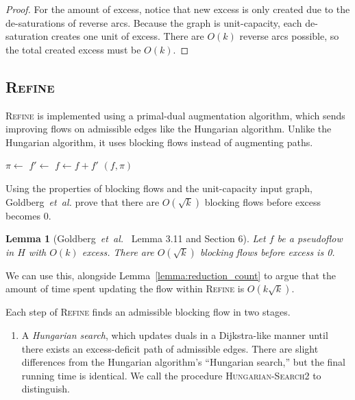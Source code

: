 \documentclass[11pt]{article}
\def\etal{\textsl{et~al.}}
\theoremstyle{plain}
\newtheorem{lemma}{Lemma}
\begin{document}
\begin{figure*}
\begin{proof}
	For the amount of excess, notice that new excess is only created due
	to the de-saturations of reverse arcs.
	Because the graph is unit-capacity, each de-saturation creates one unit
	of excess.
	There are $O(k)$ reverse arcs possible, so the total created excess
	must be $O(k)$.
\end{proof}

\subsection{\textsc{Refine}}

\textsc{Refine} is implemented using a primal-dual augmentation algorithm,
which sends improving flows on admissible edges like the Hungarian algorithm.
Unlike the Hungarian algorithm, it uses blocking flows instead of augmenting
paths.

\begin{algorithm}
\caption{Refinement}
\begin{algorithmic}[1]
		\State $\pi \gets$ 
		\State $f' \gets$ 
		\State $f \gets f + f'$
	\EndWhile
	\State\Return $(f, \pi)$
\EndFunction
\end{algorithmic}
\end{algorithm}

Using the properties of blocking flows and the unit-capacity input graph,
Goldberg~{\etal} prove that there are $O(\sqrt{k})$ blocking flows before
excess becomes 0.

\begin{lemma}[Goldberg~{\etal}~\cite{GHKT17} Lemma 3.11 and Section 6]
	Let $f$ be a pseudoflow in $H$ with $O(k)$ excess.
	There are $O(\sqrt{k})$ blocking flows before excess is 0.
\end{lemma}

We can use this, alongside Lemma~\ref{lemma:reduction_count} to argue that the
amount of time spent updating the flow within \textsc{Refine} is
$O(k\sqrt{k})$.

Each step of \textsc{Refine} finds an admissible blocking flow in two stages.
\begin{enumerate}
\item A \emph{Hungarian search}, which updates duals in a Dijkstra-like
	manner until there exists an excess-deficit path of admissible edges.
	There are slight differences from the Hungarian algorithm's ``Hungarian
	search,'' but the final running time is identical.
	We call the procedure \textsc{Hungarian-Search2} to distinguish.


\end{enumerate}
\end{figure*}
\end{document}
